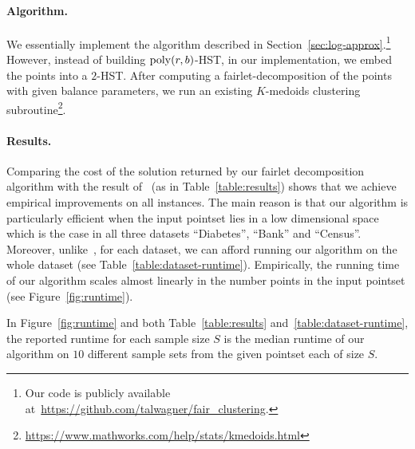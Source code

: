 \paragraph{Algorithm.} We essentially implement the algorithm described in Section~\ref{sec:log-approx}.\footnote{Our code is publicly available at~\url{https://github.com/talwagner/fair_clustering}.} However, instead of building $\mathop{\mathrm{poly}}(r,b)$-HST, in our implementation, we embed the points into a $2$-HST. After computing a fairlet-decomposition of the points with given balance parameters, we run an existing $K$-medoids clustering subroutine\footnote{\href{https://www.mathworks.com/help/stats/kmedoids.html}{https://www.mathworks.com/help/stats/kmedoids.html}}.  

\paragraph{Results.} Comparing the cost of the solution returned by our fairlet decomposition algorithm with the result of~\citep{chierichetti2017fair} (as in Table~\ref{table:results}) shows that we achieve empirical improvements on all instances. The main reason is that our algorithm is particularly efficient when the input pointset lies in a low dimensional space which is the case in all three datasets ``Diabetes'', ``Bank'' and ``Census''.   
Moreover, unlike~\citep{chierichetti2017fair}, for each dataset, we can afford running our algorithm on the whole dataset (see Table~\ref{table:dataset-runtime}). Empirically, the running time of our algorithm scales almost linearly in the number points in the input pointset (see Figure~\ref{fig:runtime}). 

In Figure~\ref{fig:runtime} and both Table~\ref{table:results} and~\ref{table:dataset-runtime}, the reported runtime for each sample size $S$ is the median runtime of our algorithm on $10$ different sample sets from the given pointset each of size $S$. 
\begin{table}[!h]
\centering
{}
\caption{The performance of our algorithm on all points in each dataset. We provide the runtime of both fairlet decomposition and the whole clustering process. Since Census dataset is not $(1,2)$-balanced, we picked a lower balance-threshold for this dataset.}
\label{table:dataset-runtime}
\end{table}



